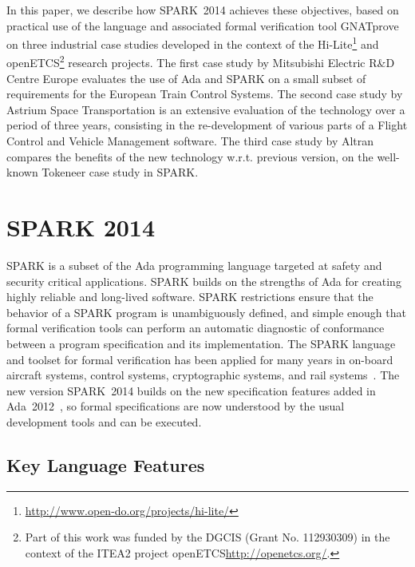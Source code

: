 \documentclass[10pt,a4paper,twocolumn]{article}
\newcommand{\hilite}{Hi-Lite\xspace}
\newcommand{\openetcs}{openETCS\xspace}
\newcommand{\gnatprove}{GNATprove\xspace}
\newcommand{\newspark}{SPARK~2014\xspace}
\newcommand{\adatwtw}{Ada~2012\xspace}
\newcommand{\wrt}{w.r.t.\xspace}
\begin{document}
In this paper, we describe how \newspark achieves these objectives, based on
practical use of the language and associated formal verification tool
\gnatprove on three industrial case studies developed in the context of the
\hilite\footnote{\url{http://www.open-do.org/projects/hi-lite/}} and
\openetcs\footnote{Part of this work was funded by the DGCIS (Grant
No. 112930309) in the context of the ITEA2 project \openetcs \url{http://openetcs.org/}.} research projects. The first
case study by Mitsubishi Electric R\&D Centre Europe evaluates the use of Ada
and SPARK on a small subset of requirements for the European Train Control
Systems. The second case study by Astrium Space Transportation is an extensive
evaluation of the technology over a period of three years, consisting in the
re-development of various parts of a Flight Control and Vehicle Management
software. The third case study by Altran compares the benefits of the new
technology \wrt previous version, on the well-known Tokeneer case study in
SPARK.

\section{SPARK 2014}


SPARK is a subset of the Ada programming language targeted at safety and
security critical applications. SPARK builds on the strengths of Ada for
creating highly reliable and long-lived software. SPARK restrictions ensure
that the behavior of a SPARK program is unambiguously defined, and simple
enough that formal verification tools can perform an automatic diagnostic of
conformance between a program specification and its implementation. The SPARK
language and toolset for formal verification has been applied for many years in
on-board aircraft systems, control systems, cryptographic systems, and rail
systems~\cite{sparkbook2012,oneill2012}. The new version \newspark builds on
the new specification features added in \adatwtw~\cite{ada2012rationale}, so
formal specifications are now understood by the usual development tools and can
be executed.

\subsection{Key Language Features}
\end{document}
